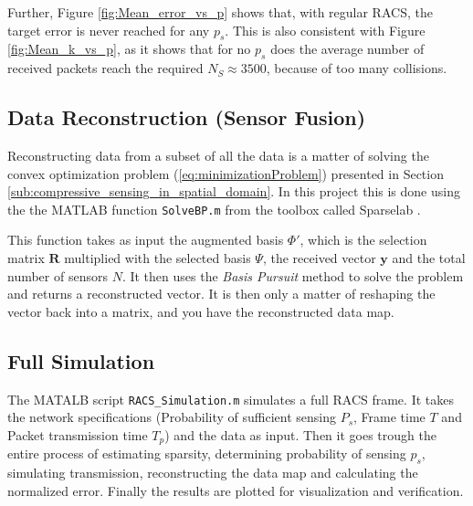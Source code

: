 \documentclass[Main]{subfiles}
\begin{document}
		Further, Figure \ref{fig:Mean_error_vs_p} shows that, with regular RACS, the target error is never reached for any $p_s$.
		This is also consistent with Figure \ref{fig:Mean_k_vs_p}, as it shows that for no $p_s$ does the average number of received packets reach the required $N_S \approx 3500$, because of too many collisions.


	\subsection{Data Reconstruction (Sensor Fusion)} %
	\label{sub:data_reconstruction}
		\vspace{-3mm} 
		Reconstructing data from a subset of all the data is a matter of solving the convex optimization problem (\ref{eq:minimizationProblem}) presented in Section \ref{sub:compressive_sensing_in_spatial_domain}.
		In this project this is done using the the MATLAB function \texttt{SolveBP.m} from the toolbox called Sparselab \cite{SparseLab:Online}.
		
		This function takes as input the augmented basis $\Phi'$, which is the selection matrix $\mathbf{R}$ multiplied with the selected basis $\Psi$, the received vector $\mathbf{y}$ and the total number of sensors $N$.
		It then uses the \emph{Basis Pursuit} method to solve the problem and returns a reconstructed vector.
		It is then only a matter of reshaping the vector back into a matrix, and you have the reconstructed data map.

	

	\subsection{Full Simulation} %
		\label{sub:full_simulation}
		\vspace{-3mm} 
		The MATALB script \texttt{RACS\_Simulation.m} simulates a full RACS frame.
		It takes the network specifications (Probability of sufficient sensing $P_s$, Frame time $T$ and Packet transmission time $T_p$) and the data as input.
		Then it goes trough the entire process of estimating sparsity, determining probability of sensing $p_s$, simulating transmission, reconstructing the data map and calculating the normalized error.
		Finally the results are plotted for visualization and verification.
		

\end{document}

